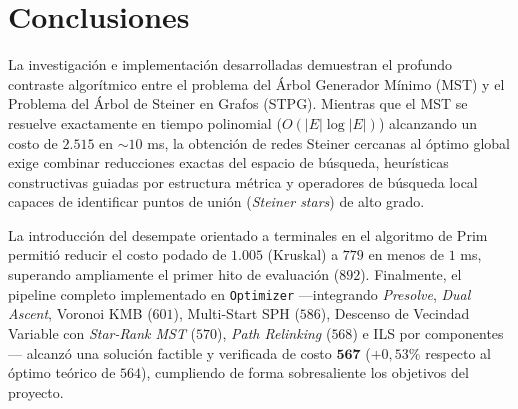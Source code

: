 \documentclass[11pt,a4paper]{article}
\begin{document}
\section{Conclusiones}
\label{sec:conclusiones}
La investigación e implementación desarrolladas demuestran el profundo contraste algorítmico entre el problema del Árbol Generador Mínimo (MST) y el Problema del Árbol de Steiner en Grafos (STPG). Mientras que el MST se resuelve exactamente en tiempo polinomial ($O(|E| \log |E|)$) alcanzando un costo de $2.515$ en $\sim 10$ ms, la obtención de redes Steiner cercanas al óptimo global exige combinar reducciones exactas del espacio de búsqueda, heurísticas constructivas guiadas por estructura métrica y operadores de búsqueda local capaces de identificar puntos de unión (\textit{Steiner stars}) de alto grado.

La introducción del desempate orientado a terminales en el algoritmo de Prim permitió reducir el costo podado de $1.005$ (Kruskal) a $779$ en menos de $1$ ms, superando ampliamente el primer hito de evaluación ($892$). Finalmente, el pipeline completo implementado en \texttt{Optimizer} —integrando \textit{Presolve}, \textit{Dual Ascent}, Voronoi KMB ($601$), Multi-Start SPH ($586$), Descenso de Vecindad Variable con \textit{Star-Rank MST} ($570$), \textit{Path Relinking} ($568$) e ILS por componentes— alcanzó una solución factible y verificada de costo $\mathbf{567}$ ($+0,53\%$ respecto al óptimo teórico de $564$), cumpliendo de forma sobresaliente los objetivos del proyecto.



\end{document}
